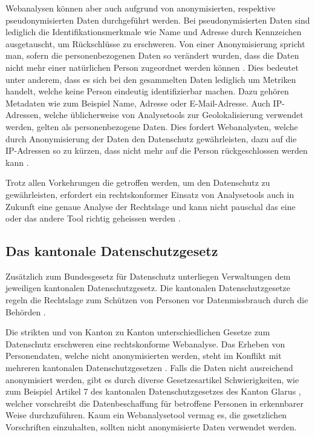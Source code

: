 Webanalysen können aber auch aufgrund von anonymisierten, respektive pseudonymisierten Daten durchgeführt werden. Bei pseudonymisierten Daten sind lediglich die Identifikationsmerkmale wie Name und Adresse durch Kennzeichen ausgetauscht, um Rückschlüsse zu erschweren. Von einer Anonymisierung spricht man, sofern die personenbezogenen Daten so verändert wurden, dass die Daten nicht mehr einer natürlichen Person zugeordnet werden können \parencite[S. 3]{EcommerceUndDatenschutz}. Dies bedeutet unter anderem, dass es sich bei den gesammelten Daten lediglich um Metriken handelt, welche keine Person eindeutig identifizierbar machen. Dazu gehören Metadaten wie zum Beispiel Name, Adresse oder E-Mail-Adresse. Auch IP-Adressen, welche üblicherweise von Analysetools zur Geolokalisierung verwendet werden, gelten als personenbezogene Daten. Dies fordert Webanalysten, welche durch Anonymisierung der Daten den Datenschutz gewährleisten, dazu auf die IP-Adressen so zu kürzen, dass nicht mehr auf die Person rückgeschlossen werden kann \parencite[S. 4]{EcommerceUndDatenschutz}.

Trotz allen Vorkehrungen die getroffen werden, um den Datenschutz zu gewährleisten, erfordert ein rechtskonformer Einsatz von Analysetools auch in Zukunft eine genaue Analyse der Rechtslage und kann nicht pauschal das eine oder das andere Tool richtig geheissen werden \parencite[S. 6]{EcommerceUndDatenschutz}.

\newpage

\subsection{Das kantonale Datenschutzgesetz}
Zusätzlich zum Bundesgesetz für Datenschutz unterliegen Verwaltungen dem jeweiligen kantonalen Datenschutzgesetz. Die kantonalen Datenschutzgesetze regeln die Rechtslage zum Schützen von Personen vor Datenmissbrauch durch die Behörden \parencite[Vgl. §§ 1 Abs. 1]{DSSGBERN}. 

Die strikten und von Kanton zu Kanton unterschiedlichen Gesetze zum Datenschutz erschweren eine rechtskonforme Webanalyse. Das Erheben von Personendaten, welche nicht anonymisierten werden, steht im Konflikt mit mehreren kantonalen Datenschutzgesetzen \parencite[Vgl. §§ 15 Abs. 1]{DSSGBERN}. Falls die Daten nicht ausreichend anonymisiert werden, gibt es durch diverse Gesetzesartikel Schwierigkeiten, wie zum Beispiel Artikel 7 des kantonalen Datenschutzgesetzes des Kanton Glarus \parencite[§§ 7 Abs. 1]{DSSGGL}, welcher vorschreibt die Datenbeschaffung für betroffene Personen in erkennbarer Weise durchzuführen. Kaum ein Webanalysetool vermag es, die gesetzlichen Vorschriften einzuhalten, sollten nicht anonymisierte Daten verwendet werden.

